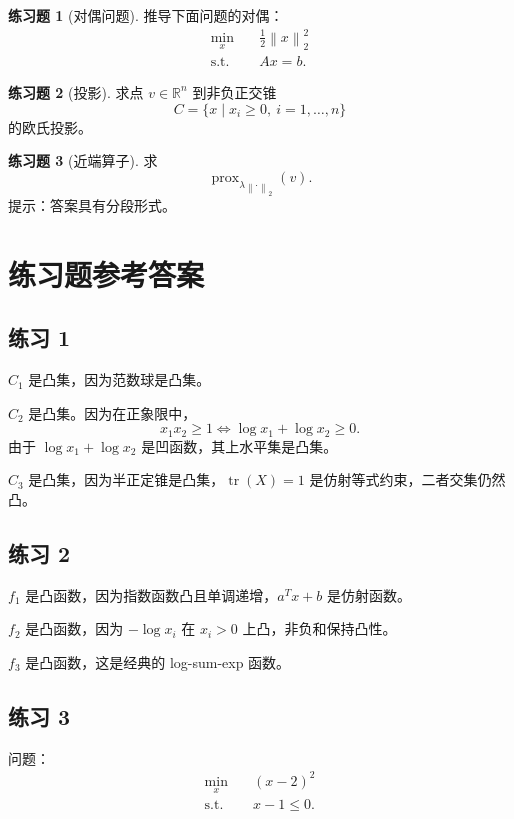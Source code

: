 \documentclass[11pt,a4paper]{ctexart}
\newcommand{\R}{\mathbb{R}}
\newcommand{\tr}{\operatorname{tr}}
\newcommand{\prox}{\operatorname{prox}}
\newcommand{\st}{\text{s.t.}}
\newcommand{\norm}[1]{\left\lVert #1 \right\rVert}
\theoremstyle{definition}
\newtheorem{exercise}{练习题}[section]
\theoremstyle{plain}
\theoremstyle{remark}
\begin{document}
\begin{exercise}[对偶问题]
推导下面问题的对偶：
\[
\begin{aligned}
    \min_x\quad & \frac12\norm{x}_2^2\\
    \st\quad & Ax=b.
\end{aligned}
\]
\end{exercise}

\begin{exercise}[投影]
求点 $v\in\R^n$ 到非负正交锥
\[
    C=\{x\mid x_i\ge0,\ i=1,\dots,n\}
\]
的欧氏投影。
\end{exercise}

\begin{exercise}[近端算子]
求
\[
    \prox_{\lambda \norm{\cdot}_2}(v).
\]
提示：答案具有分段形式。
\end{exercise}

\section{练习题参考答案}

\subsection*{练习 1}

$C_1$ 是凸集，因为范数球是凸集。

$C_2$ 是凸集。因为在正象限中，
\[
    x_1x_2\ge1
    \Longleftrightarrow
    \log x_1+\log x_2\ge0.
\]
由于 $\log x_1+\log x_2$ 是凹函数，其上水平集是凸集。

$C_3$ 是凸集，因为半正定锥是凸集，$\tr(X)=1$ 是仿射等式约束，二者交集仍然凸。

\subsection*{练习 2}

$f_1$ 是凸函数，因为指数函数凸且单调递增，$a^Tx+b$ 是仿射函数。

$f_2$ 是凸函数，因为 $-\log x_i$ 在 $x_i>0$ 上凸，非负和保持凸性。

$f_3$ 是凸函数，这是经典的 log-sum-exp 函数。

\subsection*{练习 3}

问题：
\[
\begin{aligned}
    \min_x\quad & (x-2)^2\\
    \st\quad & x-1\le0.
\end{aligned}
\]
\end{document}
